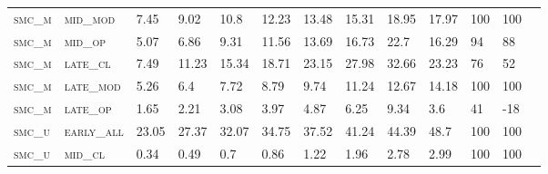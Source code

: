 \begin{landscape}
\begin{table}[!htbp]
\begin{tabular}{@{}lllllllllllll@{}}
\footnotesize \textsc{smc\_m}      & \footnotesize \textsc{mid\_mod  }               & \footnotesize 7.45            & \footnotesize 9.02            & \footnotesize 10.8             & \footnotesize 12.23            & \footnotesize 13.48            & \footnotesize 15.31            & \footnotesize 18.95       & \footnotesize 17.97    & \footnotesize 100    & \footnotesize 100      \\
\footnotesize \textsc{smc\_m}      & \footnotesize \textsc{mid\_op   }               & \footnotesize 5.07            & \footnotesize 6.86            & \footnotesize 9.31             & \footnotesize 11.56            & \footnotesize 13.69            & \footnotesize 16.73            & \footnotesize 22.7        & \footnotesize 16.29    & \footnotesize 94     & \footnotesize 88       \\
\footnotesize \textsc{smc\_m}      & \footnotesize \textsc{late\_cl  }               & \footnotesize 7.49            & \footnotesize 11.23           & \footnotesize 15.34            & \footnotesize 18.71            & \footnotesize 23.15            & \footnotesize 27.98            & \footnotesize 32.66       & \footnotesize 23.23    & \footnotesize 76     & \footnotesize 52       \\
\footnotesize \textsc{smc\_m}      & \footnotesize \textsc{late\_mod }               & \footnotesize 5.26            & \footnotesize 6.4             & \footnotesize 7.72             & \footnotesize 8.79             & \footnotesize 9.74             & \footnotesize 11.24            & \footnotesize 12.67       & \footnotesize 14.18    & \footnotesize 100    & \footnotesize 100      \\
\footnotesize \textsc{smc\_m}      & \footnotesize \textsc{late\_op  }               & \footnotesize 1.65            & \footnotesize 2.21            & \footnotesize 3.08             & \footnotesize 3.97             & \footnotesize 4.87             & \footnotesize 6.25             & \footnotesize 9.34        & \footnotesize 3.6      & \footnotesize 41     & \footnotesize -18      \\
\footnotesize \textsc{smc\_u}      & \footnotesize \textsc{early\_all}               & \footnotesize 23.05           & \footnotesize 27.37           & \footnotesize 32.07            & \footnotesize 34.75            & \footnotesize 37.52            & \footnotesize 41.24            & \footnotesize 44.39       & \footnotesize 48.7     & \footnotesize 100    & \footnotesize 100      \\
\footnotesize \textsc{smc\_u}      & \footnotesize \textsc{mid\_cl   }               & \footnotesize 0.34            & \footnotesize 0.49            & \footnotesize 0.7              & \footnotesize 0.86             & \footnotesize 1.22             & \footnotesize 1.96             & \footnotesize 2.78        & \footnotesize 2.99     & \footnotesize 100    & \footnotesize 100      \\

\end{tabular}
\end{table}
\end{landscape}
